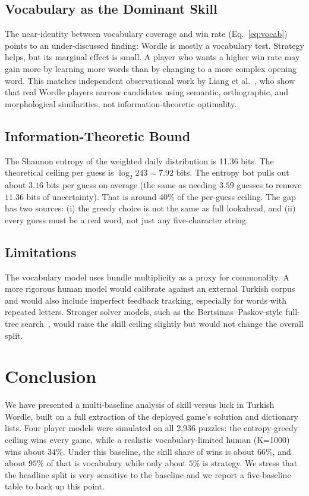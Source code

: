 \documentclass[conference]{IEEEtran}
\begin{document}
\subsection{Vocabulary as the Dominant Skill}

The near-identity between vocabulary coverage and win rate
(Eq.~\ref{eq:vocab}) points to an under-discussed finding: Wordle is
mostly a vocabulary test. Strategy helps, but its marginal effect is
small. A player who wants a higher win rate may gain more by learning
more words than by changing to a more complex opening word. This
matches independent observational work by Liang et
al.~\cite{liang2024biases}, who show that real Wordle players narrow
candidates using semantic, orthographic, and morphological
similarities, not information-theoretic optimality.

\subsection{Information-Theoretic Bound}

The Shannon entropy of the weighted daily distribution is 11.36 bits.
The theoretical ceiling per guess is $\log_2 243 = 7.92$ bits. The
entropy bot pulls out about $3.16$ bits per guess on average (the
same as needing $3.59$ guesses to remove $11.36$ bits of
uncertainty). That is around $40\%$ of the per-guess ceiling. The gap
has two sources: (i) the greedy choice is not the same as full
lookahead, and (ii) every guess must be a real word, not just any
five-character string.

\subsection{Limitations}

The vocabulary model uses bundle multiplicity as a proxy for
commonality. A more rigorous human model would calibrate against an
external Turkish corpus and would also include imperfect feedback
tracking, especially for words with repeated letters. Stronger
solver models, such as the Bertsimas--Paskov-style full-tree
search~\cite{bertsimas2022wordle}, would raise the skill ceiling
slightly but would not change the overall split.

\section{Conclusion}

We have presented a multi-baseline analysis of skill versus luck in
Turkish Wordle, built on a full extraction of the deployed game's
solution and dictionary lists. Four player models were simulated on
all 2{,}936 puzzles: the entropy-greedy ceiling wins every game, while
a realistic vocabulary-limited human (K=1000) wins about $34\%$.
Under this baseline, the skill share of wins is about $66\%$, and
about $95\%$ of that is vocabulary while only about $5\%$ is strategy.
We stress that the headline split is very sensitive to the baseline
and we report a five-baseline table to back up this point.
\end{document}
